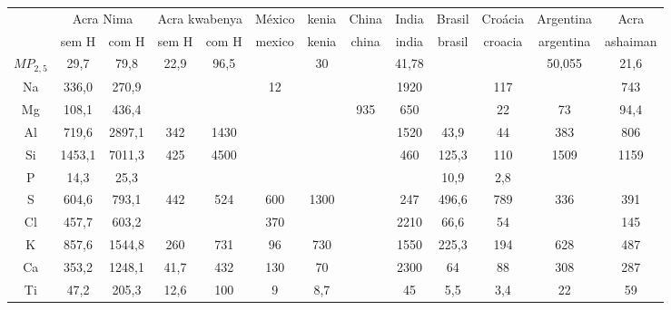 
\begin{tabular}{ccccccccccccc}
\hline
& \multicolumn{2}{c}{Acra Nima} & \multicolumn{2}{c}{Acra kwabenya} & México & kenia & China & India & Brasil & Croácia & Argentina & Acra \\
& sem H & com H & sem H & com H & mexico & kenia & china & india & brasil & croacia & argentina & ashaiman \\
\hline
$MP_{2,5}$    & 29,7       & 79,8       & 22,9             & 96,5         &        & 30    &       & 41,78 &        &         & 50,055    & 21,6     \\
Na       & 336,0      & 270,9      &                  &              & 12     &       &       & 1920  &        & 117     &           & 743      \\
Mg       & 108,1      & 436,4      &                  &              &        &       & 935   & 650   &        & 22      & 73        & 94,4     \\
Al       & 719,6      & 2897,1     & 342              & 1430         &        &       &       & 1520  & 43,9   & 44      & 383       & 806      \\
Si       & 1453,1     & 7011,3     & 425              & 4500         &        &       &       & 460   & 125,3  & 110     & 1509      & 1159     \\
P        & 14,3       & 25,3       &                  &              &        &       &       &       & 10,9   & 2,8     &           &          \\
S        & 604,6      & 793,1      & 442              & 524          & 600    & 1300  &       & 247   & 496,6  & 789     & 336       & 391      \\
Cl       & 457,7      & 603,2      &                  &              & 370    &       &       & 2210  & 66,6   & 54      &           & 145      \\
K        & 857,6      & 1544,8     & 260              & 731          & 96     & 730   &       & 1550  & 225,3  & 194     & 628       & 487      \\
Ca       & 353,2      & 1248,1     & 41,7             & 432          & 130    & 70    &       & 2300  & 64     & 88      & 308       & 287      \\
Ti       & 47,2       & 205,3      & 12,6             & 100          & 9      & 8,7   &       & 45    & 5,5    & 3,4     & 22        & 59       \\

\end{tabular}
